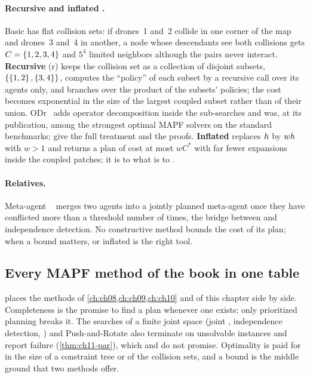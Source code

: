 \paragraph{Recursive and inflated \mstar.} Basic \mstar has flat collision
sets: if drones~1 and~2 collide in one corner of the map and drones~3 and~4
in another, a node whose descendants see both collisions gets $C =
\left\{ 1,2,3,4 \right\}$ and $5^4$ limited neighbors although the pairs never
interact. \textbf{Recursive \mstar} (r\mstar)
keeps the collision set as a collection of disjoint subsets,
$\left\{ \left\{ 1,2 \right\}, \left\{ 3,4 \right\} \right\}$, computes the ``policy'' of each subset by a
recursive \mstar call over its agents only, and branches over the product
of the subsets' policies; the cost becomes exponential in the size of the
largest coupled subset rather than of their union.
ODr\mstar~\cite{ferner2013odrmstar} adds operator decomposition inside the
sub-searches and was, at its publication, among the strongest optimal MAPF
solvers on the standard benchmarks; \textcite{wagner2015subdimensional}
give the full treatment and the proofs. \textbf{Inflated
\mstar} replaces $h$ by $wh$ with $w > 1$ and
returns a plan of cost at most $wC^*$ with far fewer expansions inside the
coupled patches; it is to \mstar what \ecbs is to \cbs.

\paragraph{Relatives.} Meta-agent \cbs~\cite{sharon2015cbs} merges two
agents into a jointly planned meta-agent once they have conflicted more
than a threshold number of times, the bridge between \cbs and independence
detection. No constructive method bounds the cost of its plan; when a bound
matters, \ecbs or inflated \mstar is the right tool.

\subsection{Every MAPF method of the book in one table}
\label{sec:ch11-comparison}

 places the methods of \cref{ch:ch08,ch:ch09,ch:ch10}
and of this chapter side by side. Completeness is the promise to find a
plan whenever one exists; only prioritized planning breaks it. The searches
of a finite joint space (joint \astar, independence detection, \mstar) and
Push-and-Rotate also terminate on unsolvable instances and report failure
(\cref{thm:ch11-par}), which \cbs and \ecbs do not promise. Optimality is paid for in the size of
a constraint tree or of the collision sets, and a bound is the middle
ground that two methods offer.

